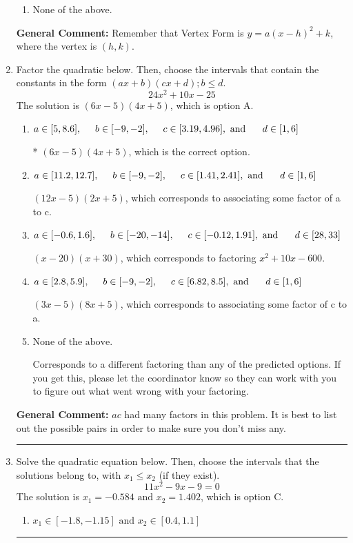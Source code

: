 \documentclass{extbook}[14pt]
\newcommand{\litem}[1]{\item #1

\rule{\textwidth}{0.4pt}}
\begin{document}
\begin{enumerate}
{\begin{enumerate}[label=\Alph*.]
\begin{multicols}{2}
\end{multicols}\item None of the above.\end{enumerate}
\textbf{General Comment:} Remember that Vertex Form is $y = a(x-h)^2+k$, where the vertex is $(h, k)$.
}
\litem{
Factor the quadratic below. Then, choose the intervals that contain the constants in the form $(ax+b)(cx+d); b \leq d.$
\[ 24x^{2} +10 x -25 \]The solution is \( (6x -5)(4x + 5) \), which is option A.\begin{enumerate}[label=\Alph*.]
\item \( a \in [5, 8.6], \hspace*{5mm} b \in [-9, -2], \hspace*{5mm} c \in [3.19, 4.96], \text{ and } \hspace*{5mm} d \in [1, 6] \)

* $(6x -5)(4x + 5)$, which is the correct option.
\item \( a \in [11.2, 12.7], \hspace*{5mm} b \in [-9, -2], \hspace*{5mm} c \in [1.41, 2.41], \text{ and } \hspace*{5mm} d \in [1, 6] \)

 $(12x -5)(2x + 5)$, which corresponds to associating some factor of a to c.
\item \( a \in [-0.6, 1.6], \hspace*{5mm} b \in [-20, -14], \hspace*{5mm} c \in [-0.12, 1.91], \text{ and } \hspace*{5mm} d \in [28, 33] \)

 $(x -20)(x + 30)$, which corresponds to factoring $x^{2} +10 x -600$.
\item \( a \in [2.8, 5.9], \hspace*{5mm} b \in [-9, -2], \hspace*{5mm} c \in [6.82, 8.5], \text{ and } \hspace*{5mm} d \in [1, 6] \)

 $(3x -5)(8x + 5)$, which corresponds to associating some factor of c to a.
\item \( \text{None of the above.} \)

 Corresponds to a different factoring than any of the predicted options. If you get this, please let the coordinator know so they can work with you to figure out what went wrong with your factoring.
\end{enumerate}

\textbf{General Comment:} $ac$ had many factors in this problem. It is best to list out the possible pairs in order to make sure you don't miss any.
}
\litem{
Solve the quadratic equation below. Then, choose the intervals that the solutions belong to, with $x_1 \leq x_2$ (if they exist).
\[ 11x^{2} -9 x -9 = 0 \]The solution is \( x_1 = -0.584 \text{ and } x_2 = 1.402 \), which is option C.\begin{enumerate}[label=\Alph*.]
\item \( x_1 \in [-1.8, -1.15] \text{ and } x_2 \in [0.4, 1.1] \)


\end{enumerate}}
\end{enumerate}
\end{document}
